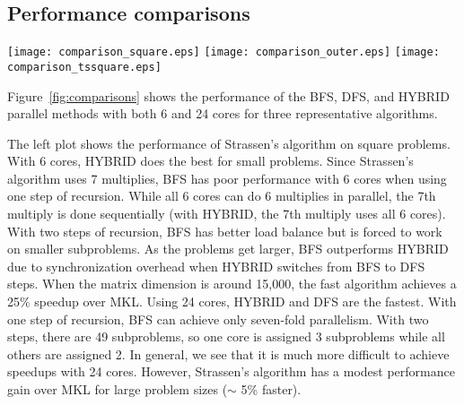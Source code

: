\documentclass[preprint]{sigplanconf}
\begin{document}
\subsection{Performance comparisons}

\begin{figure*}[tb]
\centering
\texttt{[image: comparison\_square.eps]}
\texttt{[image: comparison\_outer.eps]}
\texttt{[image: comparison\_tssquare.eps]}
\caption{
Effective performance (Equation~\eqref{eqn:eff_perf}) comparison of the BFS, DFS, and HYBRID parallel implementations on a few fast algorithms and problem sizes.
We use 6 and 24 cores to show the bandwidth limitations of the matrix additions.
(Left): 
Strassen's algorithm on square problems.
With 6 cores, we see significant speedups on large problems.
(Middle):
The $\bc{4}{2}{4}$ fast algorithm (26 multiplies) on $\dims{N}{2800}{N}$ problems.
HYBRID performs the best in all cases.
With 6 cores, the fast algorithm consistently outperforms MKL.
With 24 cores, the fast algorithm can achieve significant speedups for small problem sizes.
(Right):
The $\bc{4}{3}{3}$ fast algorithm (29 multiplies) on $\dims{N}{3000}{3000}$ problems.
HYBRID again performs the best.
With 24 cores, the fast algorithm gets modest speedups over MKL and achieves significant speedups on small problems.
}
\label{fig:comparisons}
\end{figure*}

Figure~\ref{fig:comparisons} shows the performance of the BFS, DFS, and HYBRID parallel methods with both 6 and 24 cores for three  representative algorithms.

The left plot shows the performance of Strassen's algorithm on square problems.
With 6 cores, HYBRID does the best for small problems.
Since Strassen's algorithm uses 7 multiplies, BFS has poor performance with 6 cores when using one step of recursion.
While all 6 cores can do 6 multiplies in parallel, the 7th multiply is done sequentially (with HYBRID, the 7th multiply uses all 6 cores).
With two steps of recursion, BFS has better load balance but is forced to work on smaller subproblems.
As the problems get larger, BFS outperforms HYBRID due to synchronization overhead when HYBRID switches from BFS to DFS steps.
When the matrix dimension is around 15,000, the fast algorithm achieves a 25\% speedup over MKL.
Using 24 cores, HYBRID and DFS are the fastest.
With one step of recursion, BFS can achieve only seven-fold parallelism.
With two steps, there are 49 subproblems, so one core is assigned 3 subproblems while all others are assigned 2.
In general, we see that it is much more difficult to achieve speedups with 24 cores.
However, Strassen's algorithm has a modest performance gain over MKL for large problem sizes ($\sim$ 5\% faster).
\end{document}
